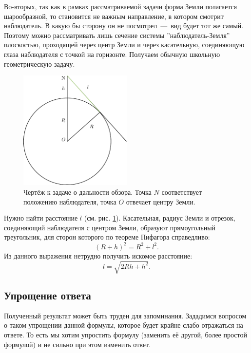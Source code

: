 \documentclass[12pt]{article}
\begin{document}
\par
Во\--вторых, так как в рамках рассматриваемой задачи форма Земли полагается шарообразной, то становится не важным направление, в котором смотрит наблюдатель. В какую бы сторону он не посмотрел~\----~вид будет тот же самый. Поэтому можно рассматривать лишь сечение системы ''наблюдатель\--Земля'' плоскостью, проходящей через центр Земли и через касательную, соединяющую глаза наблюдателя с точкой на горизонте. Получаем обычную школьную геометрическую задачу.
\begin{figure}[!ht]
 \centering
 \includegraphics[width=0.5\textwidth]{first1.pdf}
 \caption{Чертёж к задаче о дальности обзора. Точка $N$ соответствует положению наблюдателя, точка $O$ отвечает центру Земли.}
 \label{fig:1}
\end{figure}
\par
Нужно найти расстояние $l$ (см. рис. \ref{fig:1}). Касательная, радиус Земли и отрезок, соединяющий наблюдателя с центром Земли, образуют прямоугольный треугольник, для сторон которого по теореме Пифагора справедливо:
\begin{equation}
 (R+h)^2 = R^2 + l^2.
\end{equation}
Из данного выражения нетрудно получить искомое расстояние:
\begin{equation}\label{eq:1}
 l = \sqrt{2Rh + h^2}.
\end{equation}

\subsection{Упрощение ответа}
Полученный результат может быть труден для запоминания. Зададимся вопросом о таком упрощении данной формулы, которое будет крайне слабо отражаться на ответе. То есть мы хотим упростить формулу (заменить её другой, более простой формулой) и не сильно при этом изменить ответ.
\end{document}
